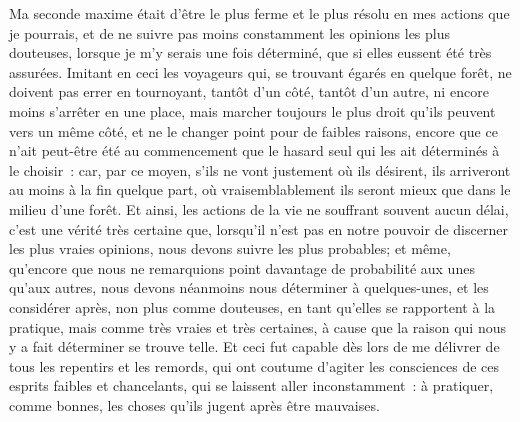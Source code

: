 \documentclass[french,twoside]{book} %
\begin{document}
Ma seconde maxime était d'être le plus ferme et le plus résolu en mes actions que je pourrais, et de ne suivre pas moins constamment les opinions les plus douteuses, lorsque je m'y serais une fois déterminé, que si elles eussent été très assurées. Imitant en ceci les voyageurs qui, se trouvant égarés en quelque forêt, ne doivent pas errer en tournoyant, tantôt d'un côté, tantôt d'un autre, ni encore moins s'arrêter en une place, mais marcher toujours le plus droit qu'ils peuvent vers un même côté, et ne le changer point pour de faibles raisons, encore que ce n'ait peut-être été au commencement que le hasard seul qui les ait déterminés à le choisir : car, par ce moyen, s'ils ne vont justement où ils désirent, ils arriveront au moins à la fin quelque part, où vraisemblablement ils seront mieux que dans le milieu d'une forêt. Et ainsi, les actions de la vie ne souffrant souvent aucun délai, c'est une vérité très certaine que, lorsqu'il n'est pas en notre pouvoir de discerner les plus vraies opinions, nous devons suivre les plus probables; et même, qu'encore que nous ne remarquions point davantage de probabilité aux unes qu'aux autres, nous devons néanmoins nous déterminer à quelques-unes, et les considérer après, non plus comme douteuses, en tant qu'elles se rapportent à la pratique, mais comme très vraies et très certaines, à cause que la raison qui nous y a fait déterminer se trouve telle. Et ceci fut capable dès lors de me délivrer de tous les repentirs et les remords, qui ont coutume d'agiter les consciences de ces esprits faibles et chancelants, qui se laissent aller inconstamment : à pratiquer, comme bonnes, les choses qu'ils jugent après être mauvaises.\par
\end{document}
